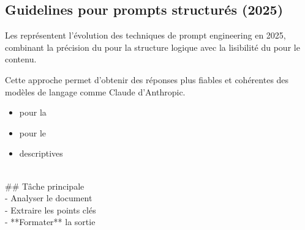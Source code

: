 
\subsection{Guidelines pour prompts structurés (2025)}

\begin{Definition}
    Les  représentent l'évolution des techniques de prompt engineering en 2025, combinant la précision du  pour la structure logique avec la lisibilité du  pour le contenu.
    
    Cette approche permet d'obtenir des réponses plus fiables et cohérentes des modèles de langage comme Claude d'Anthropic.
\end{Definition}

\begin{Methode}
    \begin{tcbraster}[raster columns=2,raster equal height=rows]
        \begin{tcolorbox}[title=Principe fondamental]
            \begin{itemize}[label=$\bullet$,itemsep=1.3em,leftmargin=*]
                \item {} pour la 
                \item {} pour le 
                \item {} descriptives
            \end{itemize}
        \end{tcolorbox}
        \begin{tcolorbox}[title=Exemple de base, colback=gray!5, colframe=gray!50]
            \ttfamily\small
            \\
            \hspace{1em}\#\# Tâche principale\\
            \hspace{1em}- Analyser le document\\
            \hspace{1em}- Extraire les points clés\\
            \hspace{1em}- **Formater** la sortie\\
        \end{tcolorbox}
    \end{tcbraster}
\end{Methode}

